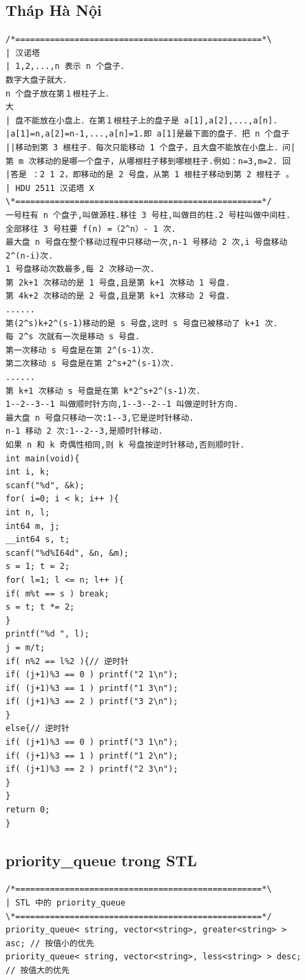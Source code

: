 \documentclass[11pt]{article}
\begin{document}
\subsection{Tháp Hà Nội}

\begingroup
\scriptsize
\begin{verbatim}
/*==================================================*\
| 汉诺塔
| 1,2,...,n 表示 n 个盘子．
数字大盘子就大．
n 个盘子放在第１根柱子上．
大
| 盘不能放在小盘上．在第１根柱子上的盘子是 a[1],a[2],...,a[n].
|a[1]=n,a[2]=n-1,...,a[n]=1.即 a[1]是最下面的盘子．把 n 个盘子
||移动到第 3 根柱子．每次只能移动 1 个盘子，且大盘不能放在小盘上．问|
第 m 次移动的是哪一个盘子，从哪根柱子移到哪根柱子.例如：n=3,m=2. 回
|答是 ：2 1 2，即移动的是 2 号盘，从第 1 根柱子移动到第 2 根柱子 。
| HDU 2511 汉诺塔 X
\*==================================================*/
一号柱有 n 个盘子,叫做源柱.移往 3 号柱,叫做目的柱.2 号柱叫做中间柱.
全部移往 3 号柱要 f(n) =（2^n）- 1 次.
最大盘 n 号盘在整个移动过程中只移动一次,n-1 号移动 2 次,i 号盘移动
2^(n-i)次.
1 号盘移动次数最多,每 2 次移动一次.
第 2k+1 次移动的是 1 号盘,且是第 k+1 次移动 1 号盘.
第 4k+2 次移动的是 2 号盘,且是第 k+1 次移动 2 号盘.
......
第(2^s)k+2^(s-1)移动的是 s 号盘,这时 s 号盘已被移动了 k+1 次.
每 2^s 次就有一次是移动 s 号盘.
第一次移动 s 号盘是在第 2^(s-1)次.
第二次移动 s 号盘是在第 2^s+2^(s-1)次.
......
第 k+1 次移动 s 号盘是在第 k*2^s+2^(s-1)次.
1--2--3--1 叫做顺时针方向,1--3--2--1 叫做逆时针方向.
最大盘 n 号盘只移动一次:1--3,它是逆时针移动.
n-1 移动 2 次:1--2--3,是顺时针移动.
如果 n 和 k 奇偶性相同,则 k 号盘按逆时针移动,否则顺时针.
int main(void){
int i, k;
scanf("%d", &k);
for( i=0; i < k; i++ ){
int n, l;
int64 m, j;
__int64 s, t;
scanf("%d%I64d", &n, &m);
s = 1; t = 2;
for( l=1; l <= n; l++ ){
if( m%t == s ) break;
s = t; t *= 2;
}
printf("%d ", l);
j = m/t;
if( n%2 == l%2 ){// 逆时针
if( (j+1)%3 == 0 ) printf("2 1\n");
if( (j+1)%3 == 1 ) printf("1 3\n");
if( (j+1)%3 == 2 ) printf("3 2\n");
}
else{// 逆时针
if( (j+1)%3 == 0 ) printf("3 1\n");
if( (j+1)%3 == 1 ) printf("1 2\n");
if( (j+1)%3 == 2 ) printf("2 3\n");
}
}
return 0;
}
\end{verbatim}
\endgroup

\subsection{priority\_queue trong STL}

\begingroup
\scriptsize
\begin{verbatim}
/*==================================================*\
| STL 中的 priority_queue
\*==================================================*/
priority_queue< string, vector<string>, greater<string> >
asc; // 按值小的优先
priority_queue< string, vector<string>, less<string> > desc;
// 按值大的优先
\end{verbatim}
\endgroup
\end{document}
